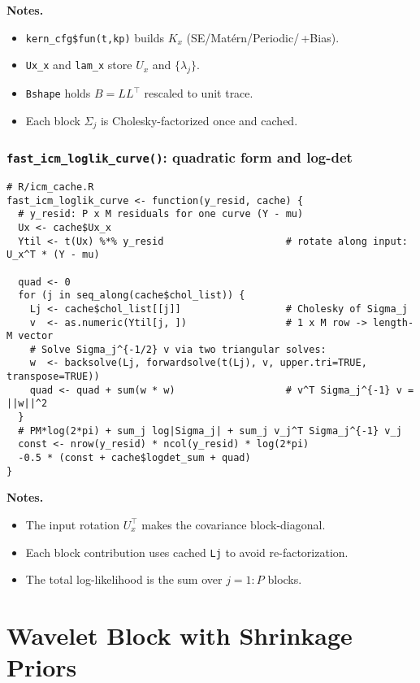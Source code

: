 \documentclass[11pt]{article}
\begin{document}
\noindent\textbf{Notes.}
\begin{itemize}
  \item \texttt{kern\_cfg\$fun(t,kp)} builds $K_x$ (SE/Mat\'ern/Periodic/\,+Bias).
  \item \texttt{Ux\_x} and \texttt{lam\_x} store $U_x$ and $\{\lambda_j\}$.
  \item \texttt{Bshape} holds $B=L L^\top$ rescaled to unit trace.
  \item Each block $\Sigma_j$ is Cholesky-factorized once and cached.
\end{itemize}

\subsubsection{\texttt{fast\_icm\_loglik\_curve()}: quadratic form and log-det}

\begin{lstlisting}
# R/icm_cache.R
fast_icm_loglik_curve <- function(y_resid, cache) {
  # y_resid: P x M residuals for one curve (Y - mu)
  Ux <- cache$Ux_x
  Ytil <- t(Ux) %*% y_resid                     # rotate along input: U_x^T * (Y - mu)

  quad <- 0
  for (j in seq_along(cache$chol_list)) {
    Lj <- cache$chol_list[[j]]                  # Cholesky of Sigma_j
    v  <- as.numeric(Ytil[j, ])                 # 1 x M row -> length-M vector
    # Solve Sigma_j^{-1/2} v via two triangular solves:
    w  <- backsolve(Lj, forwardsolve(t(Lj), v, upper.tri=TRUE, transpose=TRUE))
    quad <- quad + sum(w * w)                   # v^T Sigma_j^{-1} v = ||w||^2
  }
  # PM*log(2*pi) + sum_j log|Sigma_j| + sum_j v_j^T Sigma_j^{-1} v_j
  const <- nrow(y_resid) * ncol(y_resid) * log(2*pi)
  -0.5 * (const + cache$logdet_sum + quad)
}
\end{lstlisting}

\noindent\textbf{Notes.}
\begin{itemize}
  \item The input rotation \(U_x^\top\) makes the covariance block-diagonal.
  \item Each block contribution uses cached \texttt{Lj} to avoid re-factorization.
  \item The total log-likelihood is the sum over $j=1{:}P$ blocks.
\end{itemize}


\section{Wavelet Block with Shrinkage Priors}
\end{document}
